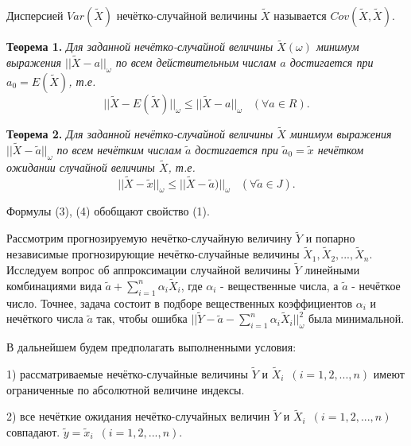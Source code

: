 Дисперсией $Var(\tilde{X})$ нечётко-случайной величины $\tilde{X}$ называется $Cov(\tilde{X}, \tilde{X})$.



\textbf{Теорема 1.} \textit{Для заданной нечётко-случайной величины $\tilde{X}(\omega)$ минимум выражения $||\tilde{X} - a||_{\omega} $ по всем действительным числам $a$ достигается при $a_0 = E(\tilde{X})$, т.е.}
\begin{equation}
||\tilde{X}-E(\tilde{X})||_{\omega}\leq ||\tilde{X}-a||_{\omega}\,\,\,\,\,(\forall a\in R).
\end{equation}

\textbf{Теорема 2. }\textit{Для заданной нечётко-случайной величины $\tilde{X}$ минимум выражения $||\tilde{X} - \tilde{a}||_{\omega}$ по всем нечётким числам $\tilde{a}$ достигается при $\tilde{a}_0 = \tilde{x}$ нечётком ожидании случайной величины $\tilde{X}$, т.е.}
\begin{equation}
||\tilde{X}-\tilde{x}||_{\omega}\leq ||\tilde{X}-\tilde{a})||_{\omega}\,\,\,\,\,(\forall \tilde{a}\in J).
\end{equation}

Формулы (3), (4) обобщают свойство (1).

Рассмотрим прогнозируемую нечётко-случайную величину $\tilde{Y}$ и попарно независимые прогнозирующие нечётко-случайные величины $\tilde{X}_1, \tilde{X}_2,..., \tilde{X}_n$. Исследуем вопрос об аппроксимации случайной величины $\tilde{Y}$ линейными комбинациями вида $\tilde{a} + \sum\limits_{i=1}^n\alpha_i\tilde{X}_i$, где $\alpha_i$ - вещественные числа, а $ \tilde{a}$ - нечёткое число. Точнее, задача состоит в подборе вещественных коэффициентов $\alpha_i$ и нечёткого числа $\tilde{a}$ так, чтобы ошибка $||\tilde{Y} - \tilde{a}- \sum\limits_{i=1}^n\alpha_i\tilde{X}_i||_{\omega}^2$ была минимальной.

В дальнейшем будем предполагать выполненными условия:

1) рассматриваемые нечётко-случайные величины $\tilde{Y}$ и $\tilde{X}_i$\,\,\,$(i = 1, 2,...,n)$ имеют ограниченные по абсолютной величине индексы.

2) все нечёткие ожидания нечётко-случайных величин $\tilde{Y}$ и $\tilde{X}_i$\,\,\,$(i = 1, 2,...,n)$ совпадают. $\tilde{y} = \tilde{x}_i$\,\,\,$(i = 1, 2,..., n)$.


